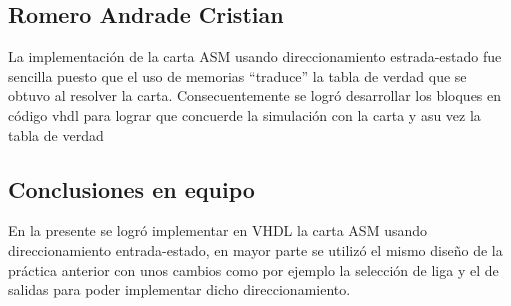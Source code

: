 \documentclass[table]{scrartcl}
\begin{document}
\subsection*{Romero Andrade Cristian}
\label{sec:romero-andr-crist}

La implementación de la carta ASM usando direccionamiento estrada-estado
fue sencilla puesto que el uso de memorias “traduce” la tabla de verdad que se
obtuvo al resolver la carta. Consecuentemente se logró desarrollar los bloques
en código vhdl para lograr que concuerde la simulación con la carta y asu vez
la tabla de verdad

\subsection*{Conclusiones en equipo}\label{sec:concl-en-equipo}

En la presente se logró implementar en VHDL la carta ASM usando
direccionamiento entrada-estado, en mayor parte se utilizó el mismo diseño
de la práctica anterior con unos cambios como por ejemplo la selección de
liga y el de salidas para poder implementar dicho direccionamiento.

\nocite{*}
\printbibliography{}
\newpage{}

\listoftables{}
\listoffigures{}
\listoflistings{}
\end{document}

